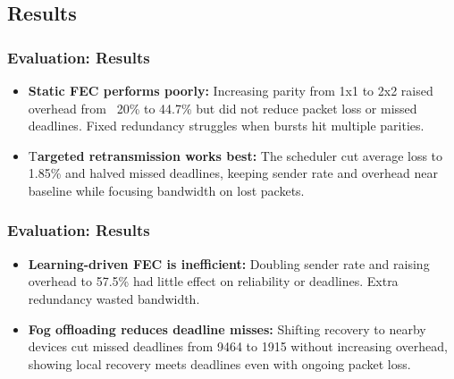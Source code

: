 \documentclass{beamer}
\begin{document}
\subsection{Results}
\begin{frame}
	\frametitle{Evaluation: Results}
	
	\begin{itemize}
		\item <1-> \textbf{Static FEC performs poorly:} Increasing parity from 1x1 to 2x2 raised overhead from ~20\% to 44.7\% but did not reduce packet loss or missed deadlines. Fixed redundancy struggles when bursts hit multiple parities.
		\item <2-> T\textbf{argeted retransmission works best:} The scheduler cut average loss to 1.85\% and halved missed deadlines, keeping sender rate and overhead near baseline while focusing bandwidth on lost packets.
		
	\end{itemize}
\end{frame}

\begin{frame}
	\frametitle{Evaluation: Results}
	
	\begin{itemize}
		\item <1-> \textbf{Learning-driven FEC is inefficient:} Doubling sender rate and raising overhead to 57.5\% had little effect on reliability or deadlines. Extra redundancy wasted bandwidth.
		\item <2-> \textbf{Fog offloading reduces deadline misses:} Shifting recovery to nearby devices cut missed deadlines from 9464 to 1915 without increasing overhead, showing local recovery meets deadlines even with ongoing packet loss.
		
	\end{itemize}
\end{frame}
\end{document}
